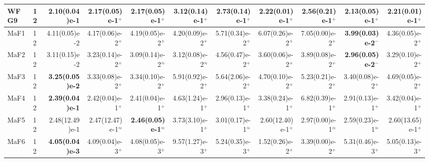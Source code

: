 \documentclass[pdflatex,sn-mathphys-ay]{sn-jnl}%
\theoremstyle{thmstyleone}%
\theoremstyle{thmstyletwo}%
\theoremstyle{thmstylethree}%
\begin{document}
\begin{landscape}
{\begin{longtable}{llrrrrrrrrr}
			WFG9                              & 12  & \textbf{2.10(0.04)e-1} & 2.17(0.05)e-1$^{+}$        & 2.17(0.05)e-1$^{+}$                & 3.12(0.14)e-1$^{+}$                & 2.73(0.14)e-1$^{+}$       & 2.22(0.01)e-1$^{+}$          & 2.56(0.21)e-1$^{+}$           & 2.13(0.05)e-1$^{+}$                & 2.21(0.01)e-1$^{+}$          \\
			\midrule
			MaF1                              & 12  & 4.11(0.05)e-2          & 4.17(0.06)e-2$^{+}$        & 4.19(0.05)e-2$^{+}$                & 4.20(0.09)e-2$^{+}$                & 5.71(0.34)e-2$^{+}$       & 6.07(0.26)e-2$^{+}$          & 7.05(0.00)e-2$^{+}$           & \textbf{3.99(0.03)e-2}$^{-}$       & 4.36(0.05)e-2$^{+}$          \\
			MaF2                              & 12  & 3.11(0.15)e-2          & 3.23(0.14)e-2$^{+}$        & 3.09(0.14)e-2$^{\approx}$          & 3.12(0.08)e-2$^{\approx}$          & 4.56(0.47)e-2$^{+}$       & 3.60(0.06)e-2$^{+}$          & 3.89(0.08)e-2$^{+}$           & \textbf{2.96(0.05)e-2}$^{-}$       & 3.29(0.10)e-2$^{+}$          \\
			MaF3                              & 12  & \textbf{3.25(0.05)e-2} & 3.33(0.08)e-2$^{+}$        & 3.34(0.10)e-2$^{+}$                & 5.91(0.92)e-2$^{+}$                & 5.64(2.06)e-2$^{+}$       & 4.70(0.10)e-2$^{+}$          & 5.23(0.21)e-2$^{+}$           & 3.40(0.08)e-2$^{+}$                & 4.69(0.05)e-2$^{+}$          \\
			MaF4                              & 12  & \textbf{2.39(0.04)e-1} & 2.42(0.04)e-1$^{+}$        & 2.41(0.04)e-1$^{+}$                & 4.63(1.24)e-1$^{+}$                & 2.96(0.13)e-1$^{+}$       & 3.38(0.24)e-1$^{+}$          & 6.82(0.39)e-1$^{+}$           & 2.91(0.13)e-1$^{+}$                & 3.42(0.04)e-1$^{+}$          \\
			MaF5                              & 12  & 2.48(12.49)e-1         & 2.47(12.47)e-1$^{\approx}$ & \textbf{2.46(0.05)e-1}$^{\approx}$ & 3.73(3.10)e-1$^{+}$                & 3.01(0.17)e-1$^{\approx}$ & 2.60(12.40)e-1$^{+}$         & 2.97(0.00)e-1$^{\approx}$     & 2.59(0.23)e-1$^{\approx}$          & 2.60(13.65)e-1$^{+}$         \\
			MaF6                              & 12  & \textbf{4.05(0.04)e-3} & 4.09(0.04)e-3$^{+}$        & 4.08(0.05)e-3$^{+}$                & 9.57(1.27)e-3$^{+}$                & 5.24(0.35)e-3$^{+}$       & 1.52(0.26)e-2$^{+}$          & 3.39(0.00)e-2$^{+}$           & 5.31(0.46)e-3$^{+}$                & 5.05(0.13)e-3$^{+}$          \\

\end{longtable}}
\end{landscape}
\end{document}
